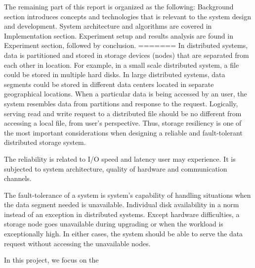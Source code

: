 The remaining part of this report is organized as the following: Background section introduces concepts and technologies that is relevant to the system design and development. System architecture and algorithms are covered in Implementation section. Experiment setup and results analysis are found in Experiment section, followed by conclusion.
=======
In distributed systems, data is partitioned and stored in storage devices (nodes) that are separated from each other in location. For example, in a small scale distributed system, a file could be stored in multiple hard disks. In large distributed systems, data segments could be stored in different data centers located in separate geographical locations. When a particular data is being accessed by an user, the system resembles data from partitions and response to the request. Logically, serving read and write request to a distributed file should be no different from accessing a local file, from user's perspective. Thus, storage resiliency is one of the most important considerations when designing a reliable and fault-tolerant distributed storage system. 

The reliability is related to I/O speed and latency user may experience. It is subjected to system architecture, quality of hardware and communication channels. 

The fault-tolerance of a system is system's capability of handling situations when the data segment needed is unavailable. Individual disk availability in a norm instead of an exception in distributed systems. Except hardware difficulties, a storage node goes unavailable during upgrading or when the workload is exceptionally high. In either cases, the system should be able to serve the data request without accessing the unavailable nodes.


 
In this project, we focus on the 


